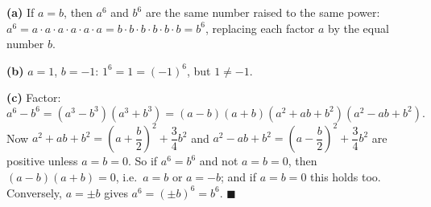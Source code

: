 \textbf{(a)} If $a=b$, then $a^6$ and $b^6$ are the same number raised to the same power: $a^6=a\cdot a\cdot a\cdot a\cdot a\cdot a=b\cdot b\cdot b\cdot b\cdot b\cdot b=b^6$, replacing each factor $a$ by the equal number $b$.

\textbf{(b)} $a=1$, $b=-1$: $1^6=1=(-1)^6$, but $1\ne-1$.

\textbf{(c)} Factor:
\[a^6-b^6=(a^3-b^3)(a^3+b^3)=(a-b)(a+b)(a^2+ab+b^2)(a^2-ab+b^2).\]
Now $a^2+ab+b^2=\left(a+\dfrac {b}{2}\right)^2+\dfrac{3}{4}b^2$ and $a^2-ab+b^2=\left(a-\dfrac {b}{2}\right)^2+\dfrac{3}{4}b^2$ are positive unless $a=b=0$. So if $a^6=b^6$ and not $a=b=0$, then $(a-b)(a+b)=0$, i.e.\ $a=b$ or $a=-b$; and if $a=b=0$ this holds too. Conversely, $a=\pm b$ gives $a^6=(\pm b)^6=b^6$. $\blacksquare$
